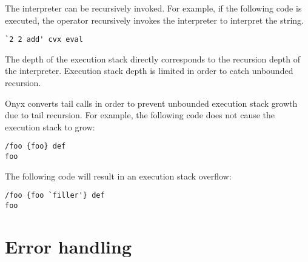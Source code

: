 The interpreter can be recursively invoked.  For example, if the following code
is executed, the  operator
recursively invokes the interpreter to interpret the string.
\begin{verbatim}
`2 2 add' cvx eval
\end{verbatim}

The depth of the execution stack directly corresponds to the recursion depth of
the interpreter.  Execution stack depth is limited in order to catch unbounded
recursion.

Onyx converts tail calls in order to prevent unbounded execution stack growth
due to tail recursion.  For example, the following code does not cause the
execution stack to grow:

\begin{verbatim}
/foo {foo} def
foo
\end{verbatim}

The following code will result in an execution stack overflow:

\begin{verbatim}
/foo {foo `filler'} def
foo
\end{verbatim}

\section{Error handling}

